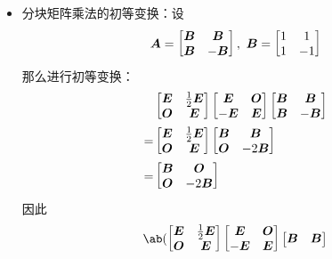\begin{problem}
\begin{solution}
\begin{itemize}
			\item 分块矩阵乘法的初等变换：设
			$$
			\matr{A} = \begin{bmatrix}
				\matr{B} & \matr{B} \\
				\matr{B} & -\matr{B}
			\end{bmatrix},\ \matr{B} = \begin{bmatrix}
				1 & 1 \\
				1 & -1
			\end{bmatrix}
			$$
			那么进行初等变换：
			$$
			\begin{aligned}
				& \begin{bmatrix}
					\matr{E} & \frac{1}{2} \matr{E} \\
					\matr{O} & \matr{E}
				\end{bmatrix}
				\begin{bmatrix}
					\matr{E} & \matr{O} \\
					-\matr{E} & \matr{E}
				\end{bmatrix} \begin{bmatrix}
					\matr{B} & \matr{B} \\
					\matr{B} & -\matr{B}
				\end{bmatrix} \\
				= & \begin{bmatrix}
					\matr{E} & \frac{1}{2} \matr{E} \\
					\matr{O} & \matr{E}
				\end{bmatrix}
				\begin{bmatrix}
					\matr{B} & \matr{B} \\
					\matr{O} & -2 \matr{B}
				\end{bmatrix} \\
				= & \begin{bmatrix}
					\matr{B} & \matr{O} \\
					\matr{O} & -2 \matr{B}
				\end{bmatrix}
			\end{aligned}
			$$
			因此
			$$
			\ab(\begin{bmatrix}
				\matr{E} & \frac{1}{2} \matr{E} \\
				\matr{O} & \matr{E}
			\end{bmatrix}
			\begin{bmatrix}
				\matr{E} & \matr{O} \\
				-\matr{E} & \matr{E}
			\end{bmatrix} \begin{bmatrix}
				\matr{B} & \matr{B} \\

\end{bmatrix}$$
\end{itemize}
\end{solution}
\end{problem}
